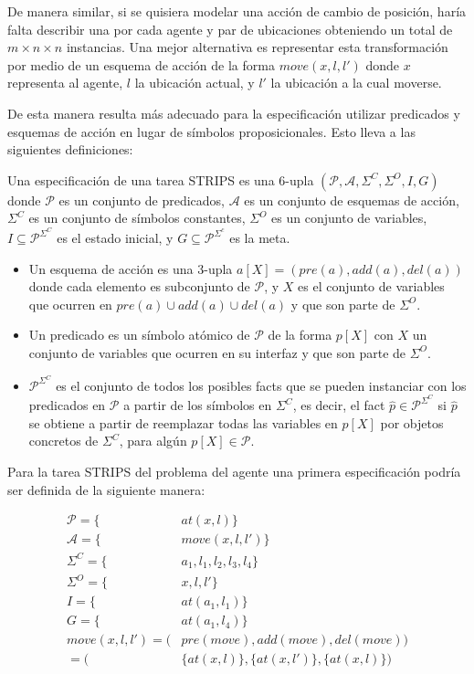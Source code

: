 De manera similar, si se quisiera modelar una acción de cambio de posición,
haría falta describir una por cada agente y par de ubicaciones obteniendo un
total de $m \times n \times n$ instancias. Una mejor alternativa es representar
esta transformación por medio de un esquema de acción de la forma $move(x, l,
l')$ donde $x$ representa al agente, $l$ la ubicación actual, y $l'$ la
ubicación a la cual moverse.

De esta manera resulta más adecuado para la especificación utilizar predicados y
esquemas de acción en lugar de símbolos proposicionales. Esto lleva a las
siguientes definiciones:

\begin{mydef}
    Una especificación de una tarea STRIPS es una 6-upla $(\mathcal{P},
    \mathcal{A}, \Sigma^{C}, \Sigma^{O}, I, G)$  donde $\mathcal{P}$ es un
    conjunto de predicados, $\mathcal{A}$ es un conjunto de esquemas de acción,
    $\Sigma^{C}$ es un conjunto de símbolos constantes, $\Sigma^{O}$ es un
    conjunto de variables, $I \subseteq \mathcal{P}^{\Sigma^{C}}$ es el estado inicial, y
    $G \subseteq \mathcal{P}^{\Sigma^{c}}$ es la meta.

    \begin{itemize}
        \item Un esquema de acción es una 3-upla $a[X] = (pre(a), add(a),
        del(a))$ donde cada elemento es subconjunto de $\mathcal{P}$, y $X$ es
        el conjunto de variables que ocurren en $pre(a) \cup add(a) \cup del(a)$
        y que son parte de $\Sigma^{O}$.
        \item Un predicado es un símbolo atómico de $\mathcal{P}$ de la forma
        $p[X]$ con $X$ un conjunto de variables que ocurren en su interfaz y que
        son parte de $\Sigma^{O}$.
        \item $\mathcal{P}^{\Sigma^{C}}$ es el conjunto de todos los posibles
        facts que se pueden instanciar con los predicados en $\mathcal{P}$ a
        partir de los símbolos en $\Sigma^C$, es decir, el fact $\hat{p} \in
        \mathcal{P}^{\Sigma^{C}}$ si $\hat{p}$ se obtiene a partir de reemplazar
        todas las variables en $p[X]$ por objetos concretos de $\Sigma^{C}$,
        para algún $p[X] \in \mathcal{P}$.
    \end{itemize}
\end{mydef}
Para la tarea STRIPS del problema del agente una primera especificación podría
ser definida de la siguiente manera:

\begin{align*}
    \mathcal{P} = \{&at(x, l)\} \\
    \mathcal{A} = \{&move(x, l, l')\} \\
    \Sigma^{C} = \{&a_1, l_1, l_2, l_3, l_4\} \\
    \Sigma^{O} = \{&x, l, l'\} \\
    I = \{&at(a_1, l_1)\} \\
    G = \{&at(a_1, l_4)\} \\
    move(x, l, l') = (&pre(move), add(move), del(move)) \\
                   = (&\{at(x, l)\}, \{at(x, l')\},\{at(x, l)\})
\end{align*}

